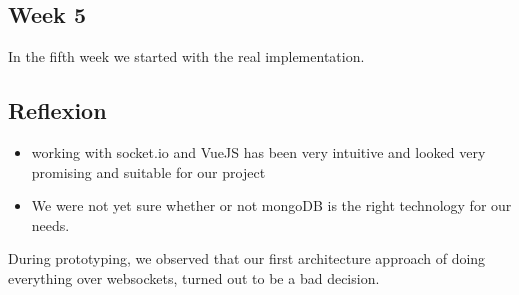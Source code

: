 \subsection{Week 5}
In the fifth week we started with the real implementation.
\subsection{Reflexion}
\begin{itemize}
\item working with socket.io and VueJS has been very intuitive and looked very promising and suitable for our project
\item We were not yet sure whether or not mongoDB is the right technology for our needs.
\end{itemize}
During prototyping, we observed that our first architecture approach of doing everything over websockets, turned out to be a bad decision. 

